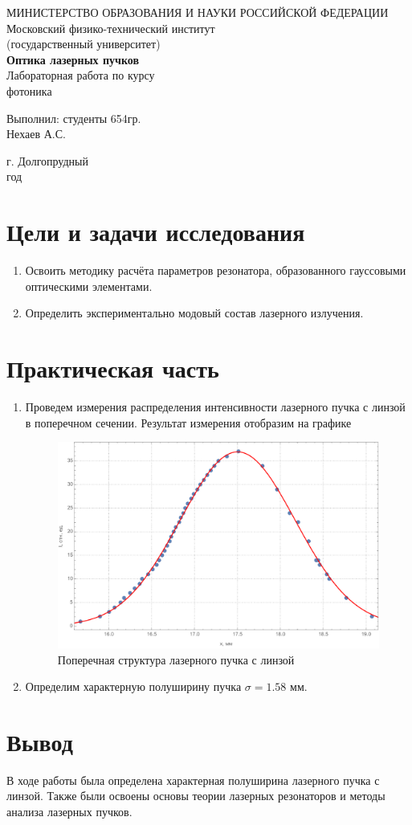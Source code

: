 \documentclass[a4paper, 12pt]{article}
\begin{document}
	\begin{titlepage}
		\begin{center}
		МИНИСТЕРСТВО ОБРАЗОВАНИЯ И НАУКИ РОССИЙСКОЙ ФЕДЕРАЦИИ\\
		\footnotesize{Московский физико-технический институт}\\
		\footnotesize{(государственный университет)}\\
		\vfill
		{\LARGE
		\textbf{Оптика лазерных пучков}\\
		}
		\vspace{1cm}
		Лабораторная работа по курсу\\
		фотоника
		\vfill
		\begin{flushright}
			Выполнил: студенты 654гр.\\
			Нехаев А.С.\\
		\end{flushright}
		\vfill
		г. Долгопрудный\\
		\the\year\:год
		\end{center}
	\end{titlepage}
	\newpage
	\section{Цели и задачи исследования}
	\begin{enumerate}
		\item Освоить методику расчёта параметров резонатора, образованного гауссовыми оптическими элементами.
		\item Определить экспериментально модовый состав лазерного излучения.
	\end{enumerate}
	\section{Практическая часть}
	\begin{enumerate}
		\item Проведем измерения распределения интенсивности лазерного пучка с линзой в поперечном сечении. Результат измерения отобразим на графике
		\begin{figure}[!htb]
			\centering
			\includegraphics[width=\textwidth]{graph.pdf}
			\caption{Поперечная структура лазерного пучка с линзой}
		\end{figure}
		\item Определим характерную полуширину пучка $\sigma=1.58$ мм.
	\end{enumerate}
	\section{Вывод}
	В ходе работы была определена характерная полуширина лазерного пучка с линзой. Также были освоены основы теории лазерных резонаторов и методы анализа лазерных пучков.
\end{document}
